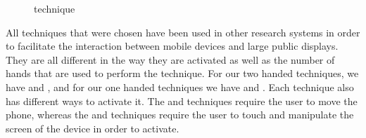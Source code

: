 \begin{figure}[H]
	\caption{\push \tilt technique}
	\label{fig:tiltTechnique}
\end{figure}

All techniques that were chosen have been used in other research systems in order to facilitate the interaction between mobile devices and large public displays.
They are all different in the way they are activated as well as the number of hands that are used to perform the technique.
For our two handed techniques, we have \throw and \grab, and for our one handed techniques we have \tilt and \swipe. 
Each technique also has different ways to activate it. 
The \throw and \tilt techniques require the user to move the phone, whereas the \swipe and \grab techniques require the user to touch and manipulate the screen of the device in order to activate. 

